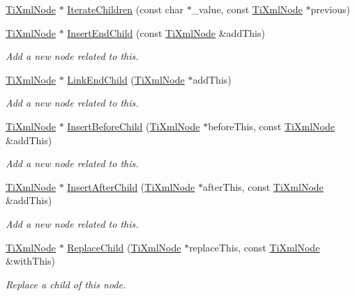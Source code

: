 \begin{DoxyCompactItemize}
\hyperlink{classTiXmlNode}{TiXmlNode} $\ast$ \hyperlink{classTiXmlNode_a67ba8275e533e6f76340236c42ea0aea}{IterateChildren} (const char $\ast$\_\-value, const \hyperlink{classTiXmlNode}{TiXmlNode} $\ast$previous)
\item 
\hyperlink{classTiXmlNode}{TiXmlNode} $\ast$ \hyperlink{classTiXmlNode_af287a913ce46d8dbf7ef24fec69bbaf0}{InsertEndChild} (const \hyperlink{classTiXmlNode}{TiXmlNode} \&addThis)
\begin{DoxyCompactList}\small\item\em Add a new node related to this. \item\end{DoxyCompactList}\item 
\hyperlink{classTiXmlNode}{TiXmlNode} $\ast$ \hyperlink{classTiXmlNode_a1a881212554b759865f6cac79a851d38}{LinkEndChild} (\hyperlink{classTiXmlNode}{TiXmlNode} $\ast$addThis)
\begin{DoxyCompactList}\small\item\em Add a new node related to this. \item\end{DoxyCompactList}\item 
\hyperlink{classTiXmlNode}{TiXmlNode} $\ast$ \hyperlink{classTiXmlNode_a71e54e393336382bc9875f64aab5cb15}{InsertBeforeChild} (\hyperlink{classTiXmlNode}{TiXmlNode} $\ast$beforeThis, const \hyperlink{classTiXmlNode}{TiXmlNode} \&addThis)
\begin{DoxyCompactList}\small\item\em Add a new node related to this. \item\end{DoxyCompactList}\item 
\hyperlink{classTiXmlNode}{TiXmlNode} $\ast$ \hyperlink{classTiXmlNode_a274db3292218202805c093f66a964cb5}{InsertAfterChild} (\hyperlink{classTiXmlNode}{TiXmlNode} $\ast$afterThis, const \hyperlink{classTiXmlNode}{TiXmlNode} \&addThis)
\begin{DoxyCompactList}\small\item\em Add a new node related to this. \item\end{DoxyCompactList}\item 
\hyperlink{classTiXmlNode}{TiXmlNode} $\ast$ \hyperlink{classTiXmlNode_a543208c2c801c84a213529541e904b9f}{ReplaceChild} (\hyperlink{classTiXmlNode}{TiXmlNode} $\ast$replaceThis, const \hyperlink{classTiXmlNode}{TiXmlNode} \&withThis)
\begin{DoxyCompactList}\small\item\em Replace a child of this node. \item\end{DoxyCompactList}\item 

\end{DoxyCompactItemize}

